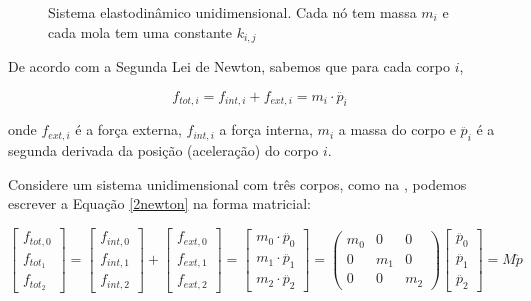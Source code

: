 \begin{figure}[ht]
	\centering
	
	\caption[Sistema elastodinâmico unidimensional]{Sistema elastodinâmico unidimensional. Cada nó tem massa $m_i$ e cada mola tem uma constante $k_{i,j}$}\label{1dbodysystem}
\end{figure}

De acordo com a Segunda Lei de Newton, sabemos que para cada corpo $i$,

\begin{equation}
f_{tot,i} = f_{int,i} + f_{ext, i} = m_i \cdot \ddot{p_i}
\label{2newton}
\end{equation}

onde $f_{ext,i}$ é a força externa,  $f_{int,i}$ a força interna, $m_i$ a massa do corpo e $\ddot{p_i}$ é a segunda derivada da posição (aceleração) do corpo $i$.  

Considere um sistema unidimensional com três corpos, como na , podemos escrever a Equação \eqref{2newton} na forma matricial:

\begin{equation}
	\begin{bmatrix}
		f_{tot,0}\\
		f_{tot_1}\\
		f_{tot_2}
	\end{bmatrix}
	=
	\begin{bmatrix}
		f_{int,0}\\
		f_{int,1}\\
		f_{int,2}
	\end{bmatrix}
	+\begin{bmatrix}
		f_{ext,0}\\
		f_{ext,1}\\
		f_{ext,2}
	\end{bmatrix}
	= 
	\begin{bmatrix}
		m_0 \cdot \ddot{p_0}\\
		m_1 \cdot \ddot{p_1}\\
		m_2 \cdot \ddot{p_2}
	\end{bmatrix}
	=
	\begin{pmatrix}
		m_0 & 0 & 0\\
		0 & m_1 & 0\\
		0 & 0 & m_2
	\end{pmatrix}
	\begin{bmatrix}
		\ddot{p_0}\\
		\ddot{p_1}\\
		\ddot{p_2}
	\end{bmatrix}
	= M\ddot{p}
\label{vecnewton}
\end{equation}

